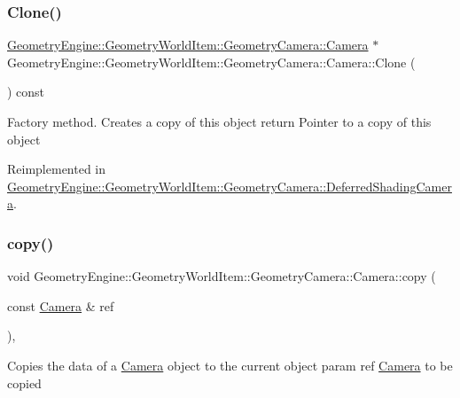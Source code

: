 \subsubsection{\texorpdfstring{Clone()}{Clone()}}
{\footnotesize\ttfamily \mbox{\hyperlink{class_geometry_engine_1_1_geometry_world_item_1_1_geometry_camera_1_1_camera}{Geometry\+Engine\+::\+Geometry\+World\+Item\+::\+Geometry\+Camera\+::\+Camera}} $\ast$ Geometry\+Engine\+::\+Geometry\+World\+Item\+::\+Geometry\+Camera\+::\+Camera\+::\+Clone (\begin{DoxyParamCaption}{ }\end{DoxyParamCaption}) const\hspace{0.3cm}{\ttfamily [virtual]}}

Factory method. Creates a copy of this object return Pointer to a copy of this object 

Reimplemented in \mbox{\hyperlink{class_geometry_engine_1_1_geometry_world_item_1_1_geometry_camera_1_1_deferred_shading_camera_ac020fe14bc32f3fdbd0c9423af1c975f}{Geometry\+Engine\+::\+Geometry\+World\+Item\+::\+Geometry\+Camera\+::\+Deferred\+Shading\+Camera}}.

\mbox{\label{class_geometry_engine_1_1_geometry_world_item_1_1_geometry_camera_1_1_camera_a821e388a441a9b4a80e8384fc79170e3}} 
\subsubsection{\texorpdfstring{copy()}{copy()}}
{\footnotesize\ttfamily void Geometry\+Engine\+::\+Geometry\+World\+Item\+::\+Geometry\+Camera\+::\+Camera\+::copy (\begin{DoxyParamCaption}\item[{const \mbox{\hyperlink{class_geometry_engine_1_1_geometry_world_item_1_1_geometry_camera_1_1_camera}{Camera}} \&}]{ref }\end{DoxyParamCaption})\hspace{0.3cm}{\ttfamily [protected]}, {\ttfamily [virtual]}}

Copies the data of a \mbox{\hyperlink{class_geometry_engine_1_1_geometry_world_item_1_1_geometry_camera_1_1_camera}{Camera}} object to the current object param ref \mbox{\hyperlink{class_geometry_engine_1_1_geometry_world_item_1_1_geometry_camera_1_1_camera}{Camera}} to be copied \mbox{\label{class_geometry_engine_1_1_geometry_world_item_1_1_geometry_camera_1_1_camera_a55464c946d6e07ea8f00f5236593ee5f}} 
